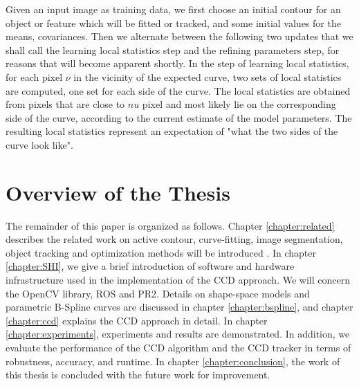 Given an input image as training data, we first choose an initial
contour for an object or feature which will be fitted or tracked, and
some initial values for the means, covariances. Then we alternate
between the following two updates that we shall call the learning
local statistics step and the refining parameters step, for reasons
that will become apparent shortly.
In the step of learning local statistics, for each pixel $\nu$ in the
vicinity of the expected curve, two sets of local statistics
are computed, one set for each side of the curve. The local statistics are obtained from
pixels that are close to $nu$ pixel and most likely lie on the corresponding side of the curve,
according to the current estimate of the model parameters. The resulting local statistics
represent an expectation of "what the two sides of the curve look
like"\cite{hanek2004contracting}.



\section{Overview of the Thesis}
\label{sec:overview}
The remainder of this paper is organized as
follows. Chapter \ref{chapter:related} describes the related work on active contour,
curve-fitting, image segmentation, object tracking and optimization methods will be
introduced . In chapter \ref{chapter:SHI}, we give a brief introduction of software
and hardware infrastructure used in the implementation of the CCD
approach. We will concern the OpenCV library, ROS and PR2. Details on shape-space models and parametric
B-Spline curves are discussed in chapter \ref{chapter:bspline},  and
chapter \ref{chapter:ccd} explains the CCD approach in detail. 
In chapter \ref{chapter:experiments}, experiments and results are demonstrated. In
addition, we evaluate the performance of the CCD algorithm and the CCD
tracker in terms of robustness, accuracy, and runtime. In chapter \ref{chapter:conclusion},
the work of this thesis is concluded with the future work for improvement.



